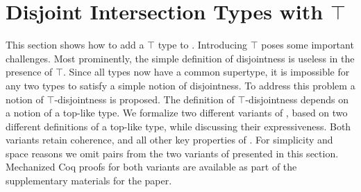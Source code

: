 \section{Disjoint Intersection Types with $\top$}\label{sec:top}

This section shows how to add a $\top$ type to \name.
Introducing $\top$ poses some important challenges. Most prominently,
the simple definition of disjointness is useless in the presence of
$\top$. Since all types now have a common supertype, it is impossible
for any two types to satisfy a simple notion of disjointness. To
address this problem a notion of $\top$-disjointness is proposed.  The
definition of $\top$-disjointness depends on a notion of a top-like
type. We formalize two different variants of \name, based on two different
definitions of a top-like type, while discussing their expressiveness. Both variants retain coherence, and all other key
properties of \name.  For simplicity and space reasons we omit pairs
from the two variants of \name presented in this section.
Mechanized Coq proofs for both variants are available as part of the 
supplementary materials for the paper.



